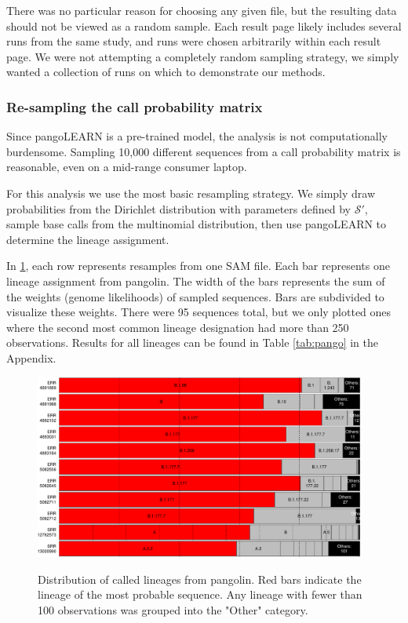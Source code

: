 \documentclass[
]{article}
\newcommand{\nps}{\mathcal{S}} %
\begin{document}
There was no particular reason for choosing any given file, but the
resulting data should not be viewed as a random sample. Each result page
likely includes several runs from the same study, and runs were chosen
arbitrarily within each result page. We were not attempting a completely
random sampling strategy, we simply wanted a collection of runs on which
to demonstrate our methods.

\hypertarget{re-sampling-the-call-probability-matrix}{%
\subsubsection{Re-sampling the call probability
matrix}\label{re-sampling-the-call-probability-matrix}}

Since pangoLEARN is a pre-trained model, the analysis is not
computationally burdensome. Sampling 10,000 different sequences from a
call probability matrix is reasonable, even on a mid-range consumer
laptop.

For this analysis we use the most basic resampling strategy. We simply
draw probabilities from the Dirichlet distribution with parameters
defined by \(\nps'\), sample base calls from the multinomial
distribution, then use pangoLEARN to determine the lineage assignment.

In \ref{fig:covidcalls}, each row represents resamples from one SAM
file. Each bar represents one lineage assignment from pangolin. The
width of the bars represents the sum of the weights (genome likelihoods)
of sampled sequences. Bars are subdivided to visualize these weights.
There were 95 sequences total, but we only plotted ones where the second
most common lineage designation had more than 250 observations. Results
for all lineages can be found in Table \ref{tab:pango} in the Appendix.

\begin{figure}
\includegraphics[width = 0.97\textwidth]{../figures/pangolin_results_report_d_files/figure-latex/pareto-1.pdf}
\label{fig:covidcalls}
\caption{Distribution of called lineages from pangolin. Red bars indicate the lineage of the most probable sequence. Any lineage with fewer than 100 observations was grouped into the "Other" category.}
\end{figure}
\end{document}
